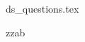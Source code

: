 \documentclass{exam}
\begin{document}


\begin{questions}

    \printanswers

    {ds_questions.tex}



     \question  zzab



\end{questions}
\end{document}

